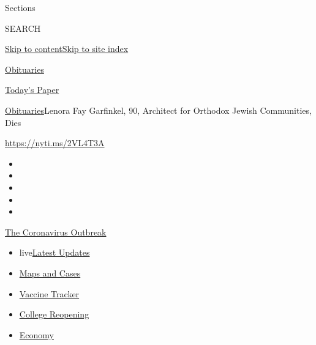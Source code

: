 Sections

SEARCH

\protect\hyperlink{site-content}{Skip to
content}\protect\hyperlink{site-index}{Skip to site index}

\href{https://www.nytimes.com/section/obituaries}{Obituaries}

\href{https://myaccount.nytimes.com/auth/login?response_type=cookie\&client_id=vi}{}

\href{https://www.nytimes.com/section/todayspaper}{Today's Paper}

\href{/section/obituaries}{Obituaries}\textbar{}Lenora Fay Garfinkel,
90, Architect for Orthodox Jewish Communities, Dies

\url{https://nyti.ms/2VL4T3A}

\begin{itemize}
\item
\item
\item
\item
\item
\end{itemize}

\href{https://www.nytimes.com/news-event/coronavirus?action=click\&pgtype=Article\&state=default\&region=TOP_BANNER\&context=storylines_menu}{The
Coronavirus Outbreak}

\begin{itemize}
\tightlist
\item
  live\href{https://www.nytimes.com/2020/08/03/world/coronavirus-covid-19.html?action=click\&pgtype=Article\&state=default\&region=TOP_BANNER\&context=storylines_menu}{Latest
  Updates}
\item
  \href{https://www.nytimes.com/interactive/2020/us/coronavirus-us-cases.html?action=click\&pgtype=Article\&state=default\&region=TOP_BANNER\&context=storylines_menu}{Maps
  and Cases}
\item
  \href{https://www.nytimes.com/interactive/2020/science/coronavirus-vaccine-tracker.html?action=click\&pgtype=Article\&state=default\&region=TOP_BANNER\&context=storylines_menu}{Vaccine
  Tracker}
\item
  \href{https://www.nytimes.com/2020/08/02/us/covid-college-reopening.html?action=click\&pgtype=Article\&state=default\&region=TOP_BANNER\&context=storylines_menu}{College
  Reopening}
\item
  \href{https://www.nytimes.com/live/2020/08/03/business/stock-market-today-coronavirus?action=click\&pgtype=Article\&state=default\&region=TOP_BANNER\&context=storylines_menu}{Economy}
\end{itemize}

